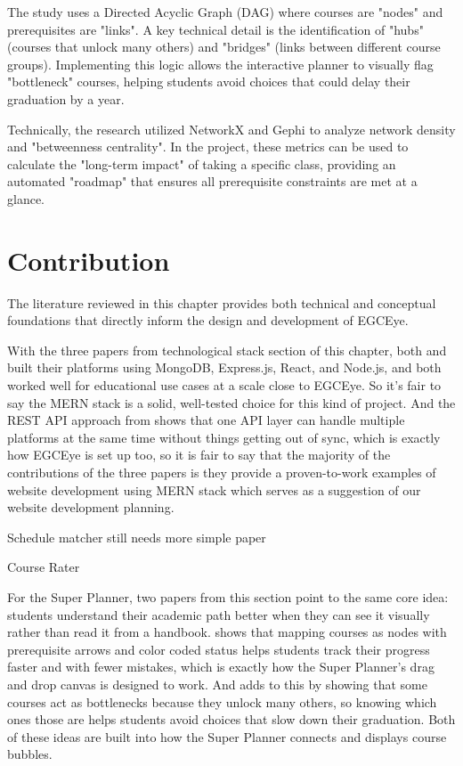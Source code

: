 The study uses a Directed Acyclic Graph (DAG) where courses are "nodes" and prerequisites are "links". A key technical detail is the identification of "hubs" (courses that unlock many others) and "bridges" (links between different course groups). Implementing this logic allows the interactive planner to visually flag "bottleneck" courses, helping students avoid choices that could delay their graduation by a year.

Technically, the research utilized NetworkX and Gephi to analyze network density and "betweenness centrality". In the project, these metrics can be used to calculate the "long-term impact" of taking a specific class, providing an automated "roadmap" that ensures all prerequisite constraints are met at a glance.

\section{Contribution}

The literature reviewed in this chapter provides both technical and conceptual foundations that directly inform the design and development of EGCEye.

With the three papers from technological stack section of this chapter, both \cite{paper_11} and \cite{paper_12} built their platforms using MongoDB, Express.js, React, and Node.js, and both worked well for educational use cases at a scale close to EGCEye. So it's fair to say the MERN stack is a solid, well-tested choice for this kind of project. And the REST API approach from \cite{paper_10} shows that one API layer can handle multiple platforms at the same time without things getting out of sync, which is exactly how EGCEye is set up too, so it is fair to say that the majority of the contributions of the three papers is they provide a proven-to-work examples of website development using MERN stack which serves as a suggestion of our website development planning.

Schedule matcher still needs more simple paper

Course Rater

For the Super Planner, two papers from this section point to the same core idea: students understand their academic path better when they can see it visually rather than read it from a handbook. \cite{paper_15} shows that mapping courses as nodes with prerequisite arrows and color coded status helps students track their progress faster and with fewer mistakes, which is exactly how the Super Planner's drag and drop canvas is designed to work. And \cite{paper_13} adds to this by showing that some courses act as bottlenecks because they unlock many others, so knowing which ones those are helps students avoid choices that slow down their graduation. Both of these ideas are built into how the Super Planner connects and displays course bubbles.

